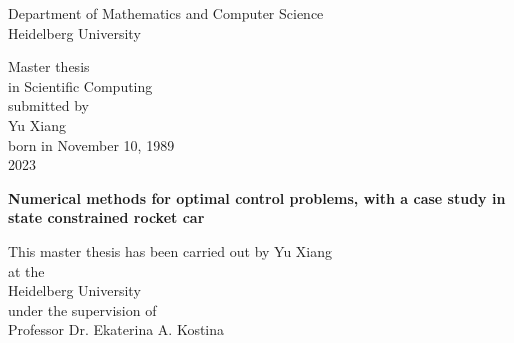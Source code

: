 
\thispagestyle{empty}
\begin{center}
  \renewcommand{\baselinestretch}{2.00}
  \Large\sffamily
  Department of Mathematics and Computer Science\\
  \large Heidelberg University
  \par\vfill\normalfont
  Master thesis\\
  in Scientific Computing\\
  submitted by\\
  Yu Xiang\\
  born in November 10, 1989\\
  2023
\end{center}
\newpage

\thispagestyle{empty}
\begin{center}
  \renewcommand{\baselinestretch}{2.00}
  \Large\bfseries\sffamily
    Numerical methods for optimal control problems, with a case study in state constrained rocket car %
  \par
  \vfill
  \large\normalfont
  This master thesis has been carried out by Yu Xiang\\
  at the\\
  Heidelberg University \\
  under the supervision of\\
  Professor Dr. Ekaterina A. Kostina
\end{center}\par
\vspace{5\baselineskip}

\renewcommand{\baselinestretch}{1.00}\normalsize